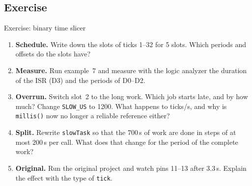 
\subsection{Exercise}
\begin{frame}{Exercise: binary time slicer}
  \begin{enumerate}
    \item \textbf{Schedule.} Write down the slots of ticks 1--32 for 5 slots. Which periods and offsets do the slots have?
    \item \textbf{Measure.} Run example~7 and measure with the logic analyzer the duration of the ISR (D3) and the periods of D0--D2.
    \item \textbf{Overrun.} Switch slot~2 to the long work. Which job starts late, and by how much? Change \texttt{SLOW\_US} to 1200. What happens to ticks/s, and why is \texttt{millis()} now no longer a reliable reference either?
    \item \textbf{Split.} Rewrite \texttt{slowTask} so that the 700\,\textmu s of work are done in steps of at most 200\,\textmu s per call. What does that change for the period of the complete work?
    \item \textbf{Original.} Run the original project and watch pins 11--13 after 3.3\,s. Explain the effect with the type of \texttt{tick}.
  \end{enumerate}
\end{frame}
